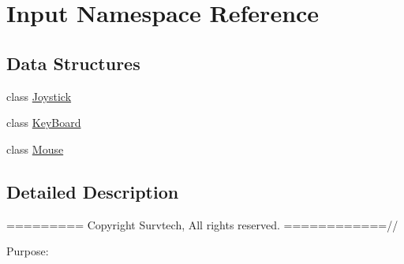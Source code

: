 \hypertarget{namespace_input}{}\section{Input Namespace Reference}
\label{namespace_input}
\subsection*{Data Structures}
\begin{DoxyCompactItemize}
\item 
class \hyperlink{class_input_1_1_joystick}{Joystick}
\item 
class \hyperlink{class_input_1_1_key_board}{Key\+Board}
\item 
class \hyperlink{class_input_1_1_mouse}{Mouse}
\end{DoxyCompactItemize}


\subsection{Detailed Description}
========= Copyright Survtech, All rights reserved. ============//

Purpose\+: 

 